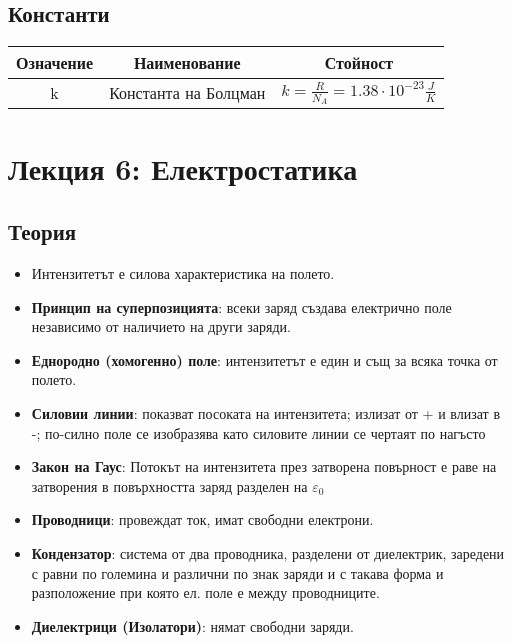 \documentclass[fleqn, 12pt]{article}
\theoremstyle{definition}
\begin{document}
\newpage
\subsection{Константи}

\begin{center}
\begin{tabular}{ |c|c|c|}
\hline
\textbf{Означение} & \textbf{Наименование}&\textbf{Стойност}\\
\hline
k & Константа на Болцман & $k = \frac{R}{N_A} = 1.38 \cdot 10^{-23} \frac{J}{K}$ \\
\hline
\end{tabular}
\end{center}

\newpage
\section{Лекция 6: Електростатика}

\subsection{Теория}

\begin{itemize}
\item Интензитетът е силова характеристика на полето. 
\item \textbf{Принцип на суперпозицията}: всеки заряд създава електрично поле независимо от наличието на други заряди. 
\item \textbf{Еднородно (хомогенно) поле}: интензитетът е един и същ за всяка точка от полето. 
\item \textbf{Силовии линии}: показват посоката на интензитета; излизат от + и влизат в -; по-силно поле се изобразява като силовите линии се чертаят по нагъсто
\item \textbf{Закон на Гаус}: Потокът на интензитета през затворена повърност е раве на затворения в повърхността заряд разделен на $\varepsilon_0$
\item \textbf{Проводници}: провеждат ток, имат свободни електрони.
\item \textbf{Кондензатор}: система от два проводника, разделени от диелектрик, заредени с равни по големина и различни по знак заряди и с такава форма и разположение при която ел. поле е между проводниците. 
\item \textbf{Диелектрици (Изолатори)}: нямат свободни заряди.
\end{itemize}
\end{document}
